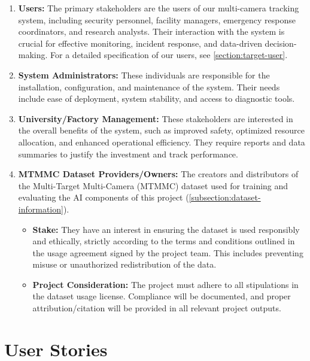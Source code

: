 \begin{enumerate}[leftmargin=80pt]
    \item \textbf{Users:} The primary stakeholders are the users of our multi-camera tracking system, including security personnel, facility managers, emergency response coordinators, and research analysts.  Their interaction with the system is crucial for effective monitoring, incident response, and data-driven decision-making.  For a detailed specification of our users, see \ref{section:target-user}.
    \item \textbf{System Administrators:}  These individuals are responsible for the installation, configuration, and maintenance of the system.  Their needs include ease of deployment, system stability, and access to diagnostic tools.
    \item \textbf{University/Factory Management:}  These stakeholders are interested in the overall benefits of the system, such as improved safety, optimized resource allocation, and enhanced operational efficiency.  They require reports and data summaries to justify the investment and track performance.
    \item \textbf{MTMMC Dataset Providers/Owners:} The creators and distributors of the Multi-Target Multi-Camera (MTMMC) dataset used for training and evaluating the AI components of this project (\ref{subsection:dataset-information}).
        \begin{itemize}
            \item \textbf{Stake:} They have an interest in ensuring the dataset is used responsibly and ethically, strictly according to the terms and conditions outlined in the usage agreement signed by the project team. This includes preventing misuse or unauthorized redistribution of the data.
            \item \textbf{Project Consideration:} The project must adhere to all stipulations in the dataset usage license. Compliance will be documented, and proper attribution/citation will be provided in all relevant project outputs.
        \end{itemize}
\end{enumerate}

\section{User Stories}
\label{section:user-stories}




